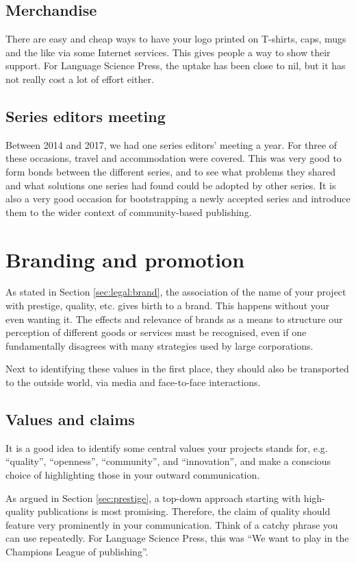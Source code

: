\documentclass[nonflat,modfonts,output=book] {langsci/langscibook}
\begin{document}
\subsection{Merchandise}
There are easy and cheap ways to have your logo printed on T-shirts, caps, mugs and the like via some Internet services. This gives people a way to show their support. For Language Science Press, the uptake has been close to nil, but it has not really cost a lot of effort either. 

\subsection{Series editors meeting}  
Between 2014 and 2017, we had one series editors' meeting a year. For three of these occasions, travel and accommodation were covered. This was very good to form bonds between the different series, and to see what problems they shared and what solutions one series had found could be adopted by other series. It is also a very good occasion for bootstrapping a newly accepted series and introduce them to the wider context of community-based publishing. 

\section{Branding and promotion}\label{sec:branding}
As stated in Section \ref{sec:legal:brand}, the association of the name of your project with prestige, quality, etc. gives birth to a brand. This happens without your even wanting it. The effects and relevance of brands as a means to structure our perception of different goods or services must be  recognised, even if one  fundamentally disagrees with many strategies used by large corporations. 

Next to identifying these values in the first place, they should also be transported to the outside world, via media and face-to-face interactions. 

\subsection{Values and claims}
It is a good idea to identify some central values your projects stands for, e.g. ``quality'', ``openness'', ``community'', and ``innovation'', and make a conscious choice of highlighting those in your outward communication. 

As argued in Section \ref{sec:prestige}, a top-down approach starting with high-quality publications is most promising. Therefore, the claim of quality should feature very prominently in your communication. Think of a catchy phrase you can use repeatedly. For Language Science Press, this was ``We want to play in the Champions League of publishing''. 
\end{document}
